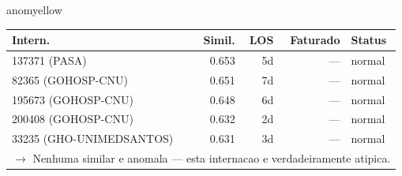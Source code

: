\documentclass[a4paper,10pt]{article}
\begin{document}
\begin{anomalycard}[Internacao 114964 | GHO-PETROBRAS | MODERADO (z=2.09)]{anomyellow}
\begin{tabular}{l r r r l}\toprule\textbf{Intern.} & \textbf{Simil.} & \textbf{LOS} & \textbf{Faturado} & \textbf{Status} \\\midrule
137371 (PASA) & 0.653 & 5d & --- & \textcolor{jcubeblue}{normal} \\
82365 (GOHOSP-CNU) & 0.651 & 7d & --- & \textcolor{jcubeblue}{normal} \\
195673 (GOHOSP-CNU) & 0.648 & 6d & --- & \textcolor{jcubeblue}{normal} \\
200408 (GOHOSP-CNU) & 0.632 & 2d & --- & \textcolor{jcubeblue}{normal} \\
33235 (GHO-UNIMEDSANTOS) & 0.631 & 3d & --- & \textcolor{jcubeblue}{normal} \\
\multicolumn{5}{l}{\textcolor{jcubeblue}{\small $\rightarrow$ Nenhuma similar e anomala --- esta internacao e verdadeiramente atipica.}} \\
\bottomrule\end{tabular}


\end{anomalycard}

\newpage
\end{document}
